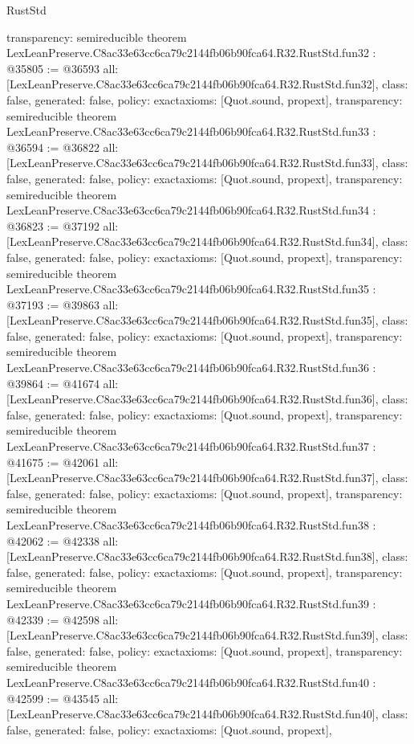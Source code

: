 \begin{lexlean}{RustStd}
\begin{coremodule}
{  transparency: semireducible
}
theorem LexLeanPreserve.C8ac33e63cc6ca79c2144fb06b90fca64.R32.RustStd.fun32 : @35805 := @36593 {
  all: [LexLeanPreserve.C8ac33e63cc6ca79c2144fb06b90fca64.R32.RustStd.fun32],
  class: false,
  generated: false,
  policy: exact{axioms: [Quot.sound, propext]},
  transparency: semireducible
}
theorem LexLeanPreserve.C8ac33e63cc6ca79c2144fb06b90fca64.R32.RustStd.fun33 : @36594 := @36822 {
  all: [LexLeanPreserve.C8ac33e63cc6ca79c2144fb06b90fca64.R32.RustStd.fun33],
  class: false,
  generated: false,
  policy: exact{axioms: [Quot.sound, propext]},
  transparency: semireducible
}
theorem LexLeanPreserve.C8ac33e63cc6ca79c2144fb06b90fca64.R32.RustStd.fun34 : @36823 := @37192 {
  all: [LexLeanPreserve.C8ac33e63cc6ca79c2144fb06b90fca64.R32.RustStd.fun34],
  class: false,
  generated: false,
  policy: exact{axioms: [Quot.sound, propext]},
  transparency: semireducible
}
theorem LexLeanPreserve.C8ac33e63cc6ca79c2144fb06b90fca64.R32.RustStd.fun35 : @37193 := @39863 {
  all: [LexLeanPreserve.C8ac33e63cc6ca79c2144fb06b90fca64.R32.RustStd.fun35],
  class: false,
  generated: false,
  policy: exact{axioms: [Quot.sound, propext]},
  transparency: semireducible
}
theorem LexLeanPreserve.C8ac33e63cc6ca79c2144fb06b90fca64.R32.RustStd.fun36 : @39864 := @41674 {
  all: [LexLeanPreserve.C8ac33e63cc6ca79c2144fb06b90fca64.R32.RustStd.fun36],
  class: false,
  generated: false,
  policy: exact{axioms: [Quot.sound, propext]},
  transparency: semireducible
}
theorem LexLeanPreserve.C8ac33e63cc6ca79c2144fb06b90fca64.R32.RustStd.fun37 : @41675 := @42061 {
  all: [LexLeanPreserve.C8ac33e63cc6ca79c2144fb06b90fca64.R32.RustStd.fun37],
  class: false,
  generated: false,
  policy: exact{axioms: [Quot.sound, propext]},
  transparency: semireducible
}
theorem LexLeanPreserve.C8ac33e63cc6ca79c2144fb06b90fca64.R32.RustStd.fun38 : @42062 := @42338 {
  all: [LexLeanPreserve.C8ac33e63cc6ca79c2144fb06b90fca64.R32.RustStd.fun38],
  class: false,
  generated: false,
  policy: exact{axioms: [Quot.sound, propext]},
  transparency: semireducible
}
theorem LexLeanPreserve.C8ac33e63cc6ca79c2144fb06b90fca64.R32.RustStd.fun39 : @42339 := @42598 {
  all: [LexLeanPreserve.C8ac33e63cc6ca79c2144fb06b90fca64.R32.RustStd.fun39],
  class: false,
  generated: false,
  policy: exact{axioms: [Quot.sound, propext]},
  transparency: semireducible
}
theorem LexLeanPreserve.C8ac33e63cc6ca79c2144fb06b90fca64.R32.RustStd.fun40 : @42599 := @43545 {
  all: [LexLeanPreserve.C8ac33e63cc6ca79c2144fb06b90fca64.R32.RustStd.fun40],
  class: false,
  generated: false,
  policy: exact{axioms: [Quot.sound, propext]},
}
\end{coremodule}
\end{lexlean}
